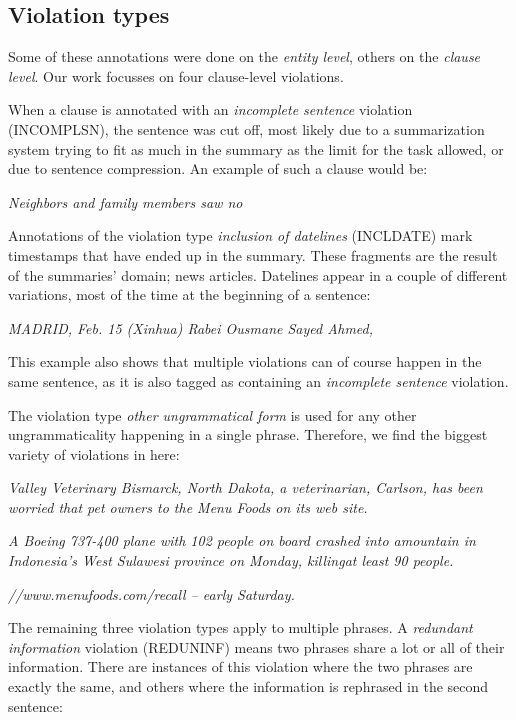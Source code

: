 \documentclass[a4paper,10pt]{scrartcl}
\theoremstyle{style}
\begin{document}
\subsection{Violation types}

Some of these annotations were done on the \textit{entity level}, others on the \textit{clause level}. Our work focusses on four clause-level violations.

When a clause is annotated with an \textit{incomplete sentence} violation (INCOMPLSN), the sentence was cut off, most likely due to a summarization system trying to fit as much in the summary as the limit for the task allowed, or due to sentence compression. An example of such a clause would be:

\quad\textit{Neighbors and family members saw no}

Annotations of the violation type \textit{inclusion of datelines} (INCLDATE) mark timestamps that have ended up in the summary. These fragments are the result of the summaries' domain; news articles. Datelines appear in a couple of different variations, most of the time at the beginning of a sentence:

\quad\textit{MADRID, Feb. 15 (Xinhua) Rabei Ousmane Sayed Ahmed,}

This example also shows that multiple violations can of course happen in the same sentence, as it is also tagged as containing an \textit{incomplete sentence} violation.

The violation type \textit{other ungrammatical form} is used for any other ungrammaticality happening in a single phrase. Therefore, we find the biggest variety of violations in here:

\quad\textit{Valley Veterinary Bismarck, North Dakota, a veterinarian, Carlson, has been worried that pet owners to the Menu Foods on its web site.}

\quad\textit{A Boeing 737-400 plane with 102 people on board crashed into amountain in Indonesia's West Sulawesi province on Monday, killingat least 90 people.}

\quad\textit{//www.menufoods.com/recall -- early Saturday.}

The remaining three violation types apply to multiple phrases. A \textit{redundant information} violation (REDUNINF) means two phrases share a lot or all of their information. There are instances of this violation where the two phrases are exactly the same, and others where the information is rephrased in the second sentence:
\end{document}
